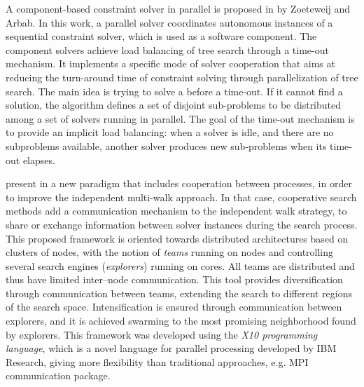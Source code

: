 A component-based constraint solver in parallel is proposed in \cite{Zoeteweij} by Zoeteweij and Arbab. In this work, a parallel solver coordinates autonomous instances of a sequential constraint solver, which is used as a software component. The component solvers achieve load balancing of tree search through a time-out mechanism. It implements a specific mode of solver cooperation that aims at reducing the turn-around time of constraint solving through parallelization of tree search. The main idea is trying to solve a \csp{} before a time-out. If it cannot find a solution, the algorithm defines a set of disjoint sub-problems to be distributed among a set of solvers running in parallel. The goal of the time-out mechanism is to provide an implicit load balancing: when a solver is idle, and there are no subproblems available, another solver produces new sub-problems when its time-out elapses.


 present in \cite{Munera} a new paradigm that includes cooperation between processes, in order to improve the independent multi-walk approach. In that case, cooperative search methods add a communication mechanism to the independent walk strategy, to share or exchange information between solver instances during the search process. This proposed framework is oriented towards distributed architectures based on clusters of nodes, with the notion of {\it teams} running on nodes and controlling several search engines ({\it explorers}) running on cores. All teams are distributed and thus have limited inter--node communication. This tool provides diversification through communication between teams, extending the search to different regions of the search space. Intensification is ensured through communication between explorers, and it is achieved swarming to the most promising neighborhood found by explorers. %
This framework was developed using the {\it X10 programming language}, which is a novel language for parallel processing developed by IBM Research, giving more flexibility than traditional approaches, e.g. MPI communication package.

